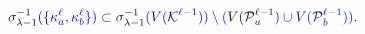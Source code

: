 \documentclass[12pt]{article}
\begin{document}
\makeatletter
\renewcommand*{\@textcolor}[3]{%
  \protect\leavevmode
  \begingroup
    \color#1{#2}#3%
  \endgroup
}
\makeatother
\begin{displaymath}
\mathcolor[RGB]{0,0,15}{\sigma} _ { \mathcolor[RGB]{0,0,30}{\lambda} \mathcolor[RGB]{0,0,45}{-} \mathcolor[RGB]{0,0,60}{1} } ^ { \mathcolor[RGB]{0,0,75}{-} \mathcolor[RGB]{0,0,90}{1} } \mathcolor[RGB]{0,0,105}{(} \mathcolor[RGB]{0,0,120}{\{} \mathcolor[RGB]{0,0,135}{\kappa} _ { \mathcolor[RGB]{0,0,150}{a} } ^ { \mathcolor[RGB]{0,0,165}{\ell} } \mathcolor[RGB]{0,0,180}{,} \mathcolor[RGB]{0,0,195}{\kappa} _ { \mathcolor[RGB]{0,0,210}{b} } ^ { \mathcolor[RGB]{0,0,225}{\ell} } \mathcolor[RGB]{0,0,240}{\}} \mathcolor[RGB]{0,0,255}{)} \mathcolor[RGB]{0,15,0}{\subset} \mathcolor[RGB]{0,15,15}{\sigma} _ { \mathcolor[RGB]{0,15,30}{\lambda} \mathcolor[RGB]{0,15,45}{-} \mathcolor[RGB]{0,15,60}{1} } ^ { \mathcolor[RGB]{0,15,75}{-} \mathcolor[RGB]{0,15,90}{1} } \mathcolor[RGB]{0,15,105}{(} \mathcolor[RGB]{0,15,120}{V} \mathcolor[RGB]{0,15,135}{(} \mathcal { \mathcolor[RGB]{0,15,150}{K} } ^ { \mathcolor[RGB]{0,15,165}{\ell} \mathcolor[RGB]{0,15,180}{-} \mathcolor[RGB]{0,15,195}{1} } \mathcolor[RGB]{0,15,210}{)} \mathcolor[RGB]{0,15,225}{)} \mathcolor[RGB]{0,15,240}{\setminus} \mathcolor[RGB]{0,15,255}{(} \mathcolor[RGB]{0,30,0}{V} \mathcolor[RGB]{0,30,15}{(} \mathcal { \mathcolor[RGB]{0,30,30}{P} } _ { \mathcolor[RGB]{0,30,45}{a} } ^ { \mathcolor[RGB]{0,30,60}{\ell} \mathcolor[RGB]{0,30,75}{-} \mathcolor[RGB]{0,30,90}{1} } \mathcolor[RGB]{0,30,105}{)} \mathcolor[RGB]{0,30,120}{\cup} \mathcolor[RGB]{0,30,135}{V} \mathcolor[RGB]{0,30,150}{(} \mathcal { \mathcolor[RGB]{0,30,165}{P} } _ { \mathcolor[RGB]{0,30,180}{b} } ^ { \mathcolor[RGB]{0,30,195}{\ell} \mathcolor[RGB]{0,30,210}{-} \mathcolor[RGB]{0,30,225}{1} } \mathcolor[RGB]{0,30,240}{)} \mathcolor[RGB]{0,30,255}{)} \mathcolor[RGB]{0,45,0}{.}
\end{displaymath}
\end{document}
